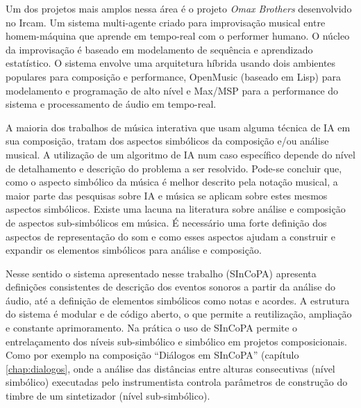 \documentclass{ppgmus}
\begin{document}
Um dos projetos mais amplos nessa área é o projeto \textit{Omax Brothers} \cite{assayag06:omax}
desenvolvido no Ircam. Um sistema multi-agente criado para
improvisação musical entre homem-máquina que aprende em tempo-real com
o performer humano. O núcleo da improvisação é baseado em modelamento
de sequência e aprendizado estatístico. O sistema envolve uma
arquitetura híbrida usando dois ambientes populares para composição e
performance, OpenMusic (baseado em Lisp) para modelamento e
programação de alto nível e Max/MSP para a performance do sistema e
processamento de áudio em tempo-real.


A maioria dos trabalhos de música interativa que usam alguma técnica de IA em sua composição,
tratam dos aspectos simbólicos da composição e/ou análise musical. A utilização de um algoritmo
de IA num caso específico depende do nível de detalhamento e descrição do problema a ser resolvido.
Pode-se concluir que, como
o aspecto simbólico da música é melhor descrito pela notação musical, a maior parte das pesquisas
sobre IA e música se aplicam sobre estes mesmos aspectos simbólicos.
Existe uma lacuna na literatura sobre 
análise e composição de aspectos sub-simbólicos em música. É necessário uma forte definição
dos aspectos de representação do som e como esses aspectos ajudam a construir e expandir os elementos 
simbólicos para análise e composição.


Nesse sentido o sistema apresentado nesse trabalho (SInCoPA) apresenta definições
consistentes de descrição dos eventos sonoros a partir da análise do áudio, até a 
definição de elementos simbólicos como notas e acordes. A estrutura do sistema é modular
e de código aberto, o que permite a reutilização, ampliação e constante aprimoramento. 
Na prática o uso de SInCoPA permite o entrelaçamento dos níveis sub-simbólico e simbólico
em projetos composicionais. Como por exemplo na composição ``Diálogos em SInCoPA'' (capítulo
\ref{chap:dialogos}, onde a análise das distâncias entre alturas consecutivas (nível simbólico)
executadas pelo instrumentista controla parâmetros de construção do timbre de um sintetizador
(nível sub-simbólico).
\end{document}
